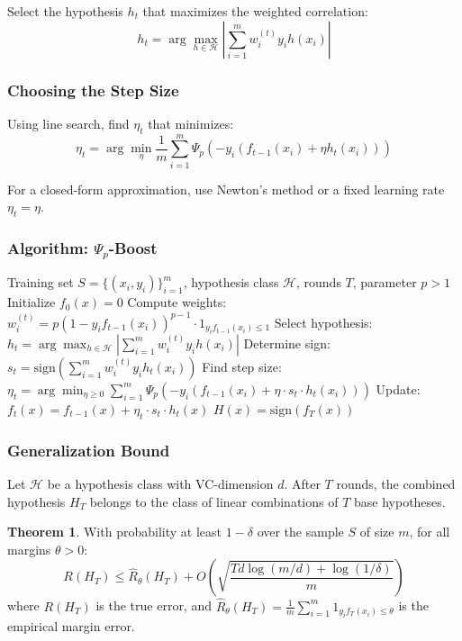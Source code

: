 \documentclass[letterpaper, 11pt]{article}
\newcommand{\1}{\mathds{1}}	%
\theoremstyle{definition}
\newtheorem{theorem}{Theorem}[section]
\begin{document}
Select the hypothesis $h_t$ that maximizes the weighted correlation:
$$h_t = \arg\max_{h \in \mathcal{H}} \left| \sum_{i=1}^{m} w_i^{(t)} y_i h(x_i) \right|$$

\subsubsection*{Choosing the Step Size}

Using line search, find $\eta_t$ that minimizes:
$$\eta_t = \arg\min_{\eta} \frac{1}{m} \sum_{i=1}^{m} \Psi_p\left(-y_i (f_{t-1}(x_i) + \eta h_t(x_i))\right)$$

For a closed-form approximation, use Newton's method or a fixed learning rate $\eta_t = \eta$.

\subsubsection*{Algorithm: $\Psi_p$-Boost}

\begin{algorithm}[H]
\caption{$\Psi_p$-Boost}
\begin{algorithmic}[1]
\REQUIRE Training set $S = \{(x_i, y_i)\}_{i=1}^m$, hypothesis class $\mathcal{H}$, rounds $T$, parameter $p > 1$
\STATE Initialize $f_0(x) = 0$
    \STATE Compute weights: $w_i^{(t)} = p(1 - y_i f_{t-1}(x_i))^{p-1} \cdot 1_{y_i f_{t-1}(x_i) \leq 1}$
    \STATE Select hypothesis: $h_t = \arg\max_{h \in \mathcal{H}} \left| \sum_{i=1}^{m} w_i^{(t)} y_i h(x_i) \right|$
    \STATE Determine sign: $s_t = \text{sign}\left( \sum_{i=1}^{m} w_i^{(t)} y_i h_t(x_i) \right)$
    \STATE Find step size: $\eta_t = \arg\min_{\eta \geq 0} \sum_{i=1}^{m} \Psi_p(-y_i(f_{t-1}(x_i) + \eta \cdot s_t \cdot h_t(x_i)))$
    \STATE Update: $f_t(x) = f_{t-1}(x) + \eta_t \cdot s_t \cdot h_t(x)$
\ENDFOR
\RETURN $H(x) = \text{sign}(f_T(x))$
\end{algorithmic}
\end{algorithm}

\subsubsection*{Generalization Bound}

Let $\mathcal{H}$ be a hypothesis class with VC-dimension $d$. After $T$ rounds, the combined hypothesis $H_T$ belongs to the class of linear combinations of $T$ base hypotheses.

\begin{theorem}
With probability at least $1 - \delta$ over the sample $S$ of size $m$, for all margins $\theta > 0$:
$$R(H_T) \leq \hat{R}_\theta(H_T) + O\left(\sqrt{\frac{T d \log(m/d) + \log(1/\delta)}{m}}\right)$$
where $R(H_T)$ is the true error, and $\hat{R}_\theta(H_T) = \frac{1}{m}\sum_{i=1}^{m} 1_{y_i f_T(x_i) \leq \theta}$ is the empirical margin error.
\end{theorem}
\end{document}
